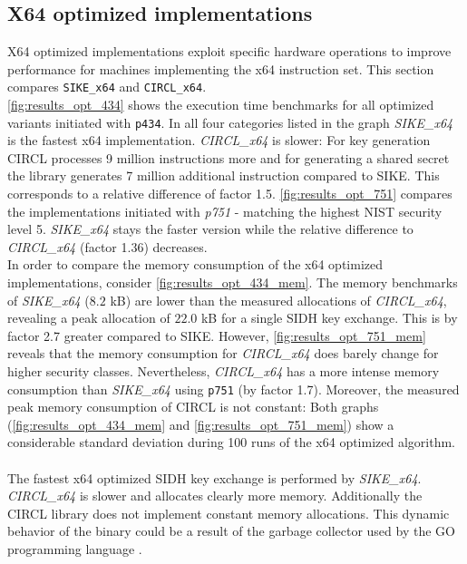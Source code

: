 \subsection{X64 optimized implementations}
\label{sec:sike_circl_analysis_x64}
X64 optimized implementations exploit specific hardware operations to improve performance for machines implementing the x64 instruction set. This section compares \texttt{SIKE\_x64} and \texttt{CIRCL\_x64}.\\
\autoref{fig:results_opt_434} shows the execution time benchmarks for all optimized variants initiated with \texttt{p434}. In all four categories listed in the graph \textit{SIKE\_x64}  is the fastest x64 implementation. \textit{CIRCL\_x64} is slower: For key generation \gls{CIRCL} processes 9 million instructions more and for generating a shared secret the library generates 7 million additional instruction compared to \gls{SIKE}. This corresponds to a relative difference of factor 1.5.
\autoref{fig:results_opt_751} compares the implementations initiated with \textit{p751} - matching the highest \gls{NIST} security level 5. \textit{SIKE\_x64} stays the faster version while the relative difference to \textit{CIRCL\_x64} (factor 1.36) decreases.
\\
In order to compare the memory consumption of the x64 optimized implementations, consider \autoref{fig:results_opt_434_mem}. The memory benchmarks of \textit{SIKE\_x64} ($8.2$ \gls{kB}) are  lower than the measured allocations of \textit{\gls{CIRCL}\_x64}, revealing  a peak allocation of $22.0$ \gls{kB} for a single \gls{SIDH} key exchange. This is by factor 2.7 greater compared to \gls{SIKE}. However, \autoref{fig:results_opt_751_mem} reveals that the memory consumption for \textit{\gls{CIRCL}\_x64} does barely change for higher security classes. Nevertheless,  \textit{\gls{CIRCL}\_x64} has a more intense memory consumption than \textit{SIKE\_x64} using \texttt{p751} (by factor 1.7). Moreover, the measured peak memory consumption of \gls{CIRCL} is not constant: Both graphs (\ref{fig:results_opt_434_mem} and \ref{fig:results_opt_751_mem}) show a considerable standard deviation during 100 runs of the x64 optimized algorithm.
\\\\
The fastest x64 optimized \gls{SIDH} key exchange is performed by \textit{SIKE\_x64}. \textit{CIRCL\_x64} is slower and allocates clearly more memory. Additionally the \gls{CIRCL} library does not implement constant memory allocations. This dynamic behavior of the binary could be a result of the garbage collector used by the GO programming language \parencite{Hudson:GGC}.

